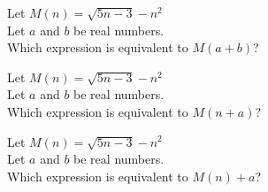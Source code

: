 \documentclass{ximera}
\author{Lee Wayand}
\begin{document}
\begin{exercise}




\begin{question}
Let $M(n) = \sqrt{5n-3}-n^2$ \\

Let $a$ and $b$ be real numbers. \\

Which expression is equivalent to $M(a+b)$?


\begin{multipleChoice}
\end{multipleChoice}

\end{question}









\begin{question}
Let $M(n) = \sqrt{5n-3}-n^2$ \\

Let $a$ and $b$ be real numbers. \\

Which expression is equivalent to $M(n+a)$?

\begin{multipleChoice}
\end{multipleChoice}

\end{question}










\begin{question}
Let $M(n) = \sqrt{5n-3}-n^2$ \\

Let $a$ and $b$ be real numbers. \\

Which expression is equivalent to $M(n)+a$?


\begin{multipleChoice}
\end{multipleChoice}


\end{question}
\end{exercise}
\end{document}
